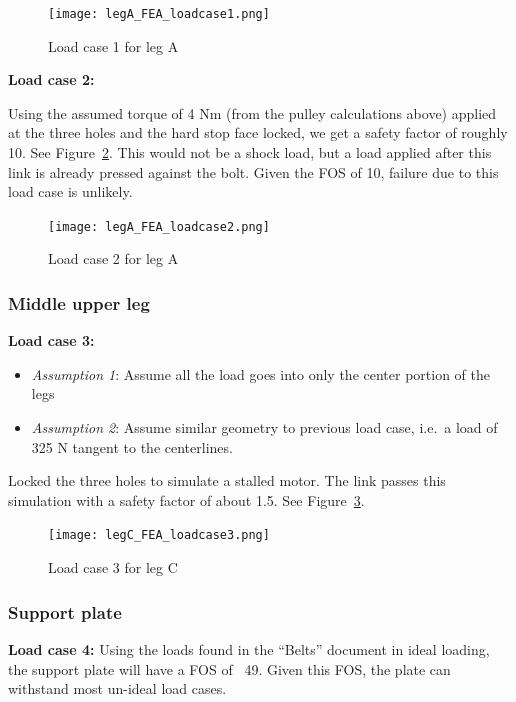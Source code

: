 \documentclass{report}
\begin{document}
\begin{figure}[H]
\centering
\texttt{[image: legA\_FEA\_loadcase1.png]}
\caption[Load case 1 for leg A]{Load case 1 for leg A}
\label{fig:legA_FEA_loadcase1}
\end{figure}

\textbf{Load case 2:}

Using the assumed torque of 4 Nm (from the pulley calculations above) applied at the three holes and the hard stop face locked, we get a safety factor of roughly 10. See Figure~\ref{fig:legA_FEA_loadcase2}. This would not be a shock load, but a load applied after this link is already pressed against the bolt. Given the FOS of 10, failure due to this load case is unlikely.

\begin{figure}[H]
\centering
\texttt{[image: legA\_FEA\_loadcase2.png]}
\caption[Load case 2 for leg A]{Load case 2 for leg A}
\label{fig:legA_FEA_loadcase2}
\end{figure}

\subsubsection[Middle upper leg]{Middle upper leg}
\textbf{Load case 3:}

\begin{itemize}
\item \textit{Assumption 1}: Assume all the load goes into only the center portion of the legs
\item \textit{Assumption 2}: Assume similar geometry to previous load case, i.e.\ a load of 325 N tangent to the centerlines.
\end{itemize}
Locked the three holes to simulate a stalled motor. The link passes this simulation with a safety factor of about 1.5. See Figure~\ref{fig:legC_FEA_loadcase3}.

\begin{figure}[H]
\centering
\texttt{[image: legC\_FEA\_loadcase3.png]}
\caption[Load case 3 for leg C]{Load case 3 for leg C}
\label{fig:legC_FEA_loadcase3}
\end{figure}

\subsubsection[Support plate]{Support plate}
\textbf{Load case 4:}
Using the loads found in the ``Belts'' document in ideal loading, the support plate will have a FOS of ~49. Given this FOS, the plate can withstand most un-ideal load cases.
\end{document}
